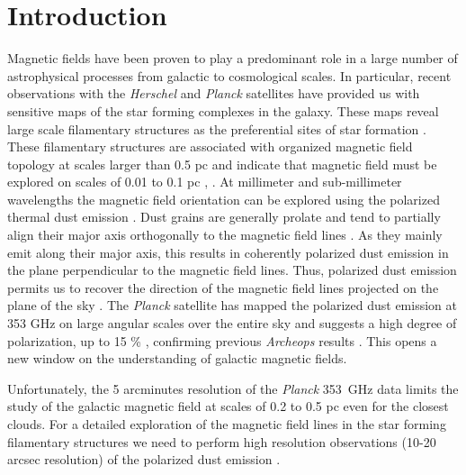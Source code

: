 \documentclass[twocolumn, traditabstract]{aa}
\def\NIKA{\textit{NIKA}}
\begin{document}
\titlerunning{\NIKA\ polarization performance}	
\maketitle

\section{Introduction}\label{sec:introduction}
Magnetic fields have been proven to play a predominant role in a large number of
astrophysical processes from galactic to cosmological scales. In particular,
recent observations with the {\it Herschel} and {\it Planck} \citep{planck2013mission}
satellites have provided us with sensitive maps of the star forming
complexes in the galaxy. These maps reveal large scale filamentary structures as
the preferential sites of star formation
\citep{2010A&A...518L.100M,arzoumianian}. These filamentary structures
are associated with organized magnetic field topology at scales larger than 0.5 pc
\citep{2014prpl.conf...27A} and indicate that magnetic field must be explored on scales of
0.01 to 0.1 pc \citep{2004ApJ...603..584P}, \citep{planckXXXIII}.
At millimeter and sub-millimeter wavelengths the magnetic field orientation can
be explored using the polarized thermal dust emission
\citep{2015A&A...576A.104P,2016arXiv160100546P}. Dust grains are generally
prolate and tend to partially align their major axis orthogonally to the
magnetic field lines \citep{1951ApJ...114..206D, 1988QJRAS..29..327H}. As they
mainly emit along their major axis, this results in coherently
polarized dust emission in the plane perpendicular to the magnetic field
lines. Thus, polarized dust emission permits us to recover the direction of the
magnetic field lines projected on the plane of the sky
\citep[{\it e.g.}][]{2015A&A...576A.106P}. The {\it Planck} satellite has mapped the polarized
dust emission at 353 GHz on large angular scales over the entire sky
\citep{2014A&A...571A...8P,2015arXiv150201587P} and suggests a high degree
of polarization, up to 15 \% \citep{planckdust}, confirming previous {\it Archeops}
results \citep{2004A&A...424..571B}. This opens a new window on the
understanding of galactic magnetic fields.

Unfortunately, the 5 arcminutes resolution of the {\it Planck} 353~GHz data limits the study of the galactic magnetic field at scales
of 0.2 to 0.5 pc even for the closest clouds. For a detailed exploration of the
magnetic field lines in the star forming filamentary structures we need to perform high resolution observations (10-20 arcsec
resolution) of the polarized dust emission \citep{2014ApJ...792..116Z}.
\end{document}
